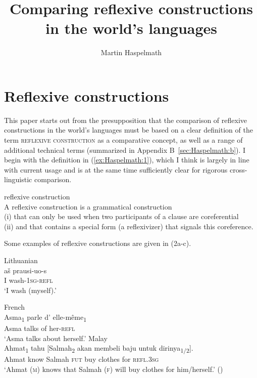 \documentclass[output=paper]{langscibook}
\author{Martin Haspelmath\affiliation{MPI-EVA Leipzig \& Leipzig University}\orcid{0000-0003-2100-8493}}
\title{Comparing reflexive constructions 
in the world’s languages}\label{chapter 2}
\begin{document}
\maketitle

 
\section{Reflexive constructions}\label{sec:Haspelmath:1}

This paper starts out from the presupposition that the comparison of reflexive constructions in the world’s languages must be based on a clear definition of the term \textsc{reflexive} \textsc{construction} as a comparative concept, as well as a range of additional technical terms (summarized in Appendix B~\ref{sec:Haspelmath:b}). I begin with the definition in (\ref{ex:Haspelmath:1}), which I think is largely in line with current usage and is at the same time sufficiently clear for rigorous cross-linguistic comparison.

\ea  \label{ex:Haspelmath:1}  reflexive construction\\
  A reflexive construction is a grammatical construction \\
  (i) that can only be used when two participants of a clause are coreferential \\
	(ii) and that contains a special form (a reflexivizer) that signals this coreference.
\z

Some examples of reflexive constructions are given in (2a-c).

\ea \label{ex:Haspelmath:2}
  \ea \label{ex:Haspelmath:2a}
   Lithuanian\\
  \gll aš	prausi-uo-s\\
     I  wash-\textsc{1sg-refl}   \\
    \glt ‘I wash (myself).’
    
    
  \ex \label{ex:Haspelmath:2b}
   French\\
  \gll Asma\textsubscript{1} 	parle 	d’	elle-même\textsubscript{1}\\
      Asma  talks  of  her-\textsc{refl}  \\
    \glt ‘Asma talks about herself.’
  \ex \label{ex:Haspelmath:2c}
   Malay\\
  \gll Ahmat\textsubscript{1}	tahu	[Salmah\textsubscript{2}	akan	membeli	baju	untuk	dirinya\textsubscript{1/2}].\\
      Ahmat  know  Salmah  \textsc{fut}  buy  clothes  for  \textsc{refl}.\textsc{3sg} \\
    \glt   ‘Ahmat (\textsc{m}) knows that Salmah (\textsc{f}) will buy clothes for him/herself.’  (\citealt[25]{Cole2005})
   \z
\z 
    
\end{document}
